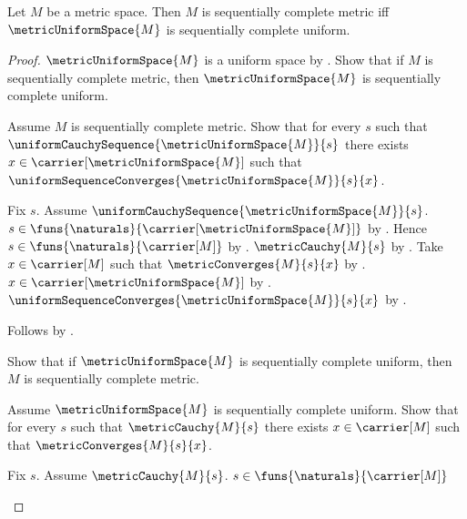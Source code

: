 \begin{theorem}\label{metric_sequential_completeness_iff_uniform}
    Let $M$ be a metric space.
    Then $M$ is sequentially complete metric iff
        $\metricUniformSpace{M}$ is sequentially complete uniform.
\end{theorem}
\begin{proof}
    $\metricUniformSpace{M}$ is a uniform space
        by .
    Show that if $M$ is sequentially complete metric, then
        $\metricUniformSpace{M}$ is sequentially complete uniform.
    \begin{subproof}
        Assume $M$ is sequentially complete metric.
        Show that for every $s$ such that
            $\uniformCauchySequence{\metricUniformSpace{M}}{s}$ there exists
            $x\in\carrier[\metricUniformSpace{M}]$ such that
            $\uniformSequenceConverges{\metricUniformSpace{M}}{s}{x}$.
        \begin{subproof}
            Fix $s$.
            Assume $\uniformCauchySequence{\metricUniformSpace{M}}{s}$.
            $s\in\funs{\naturals}{\carrier[\metricUniformSpace{M}]}$
                by .
            Hence $s\in\funs{\naturals}{\carrier[M]}$
                by .
            $\metricCauchy{M}{s}$
                by .
            Take $x\in\carrier[M]$ such that
                $\metricConverges{M}{s}{x}$
                by .
            $x\in\carrier[\metricUniformSpace{M}]$
                by .
            $\uniformSequenceConverges{\metricUniformSpace{M}}{s}{x}$
                by .
        \end{subproof}
        Follows by .
    \end{subproof}
    Show that if
        $\metricUniformSpace{M}$ is sequentially complete uniform, then
        $M$ is sequentially complete metric.
    \begin{subproof}
        Assume $\metricUniformSpace{M}$ is sequentially complete uniform.
        Show that for every $s$ such that $\metricCauchy{M}{s}$ there exists
            $x\in\carrier[M]$ such that $\metricConverges{M}{s}{x}$.
        \begin{subproof}
            Fix $s$.
            Assume $\metricCauchy{M}{s}$.
            $s\in\funs{\naturals}{\carrier[M]}$

\end{subproof}
\end{subproof}
\end{proof}
